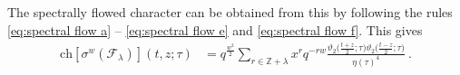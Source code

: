 \documentclass[12pt,a4paper]{article}
\begin{document}
The spectrally flowed character can be obtained from this by following the rules \eqref{eq:spectral flow a} -- \eqref{eq:spectral flow e} and \eqref{eq:spectral flow f}. This gives
\begin{align}
\mathrm{ch}[\sigma^w(\mathscr{F}_\lambda)](t,z;\tau)
&=q^{\frac{w^2}{2}} \sum_{r \in \mathds{Z}+\lambda} x^r q^{-rw} \frac{\vartheta_2\big(\frac{t+z}{2};\tau\big)\vartheta_2\big(\frac{t-z}{2};\tau\big)}{\eta(\tau)^4}\ . \label{eq:character second version}
\end{align}
\end{document}
